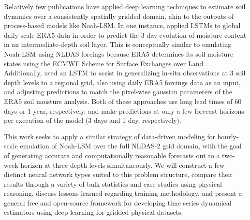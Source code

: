 Relatively few publications have applied deep learning techniques to estimate soil dynamics over a consistently spatially gridded domain, akin to the outputs of process-based models like Noah-LSM.  In one instance, \parencite{filipovic_regional_2022} applied LSTMs to global daily-scale ERA5 data in order to predict the 3-day evolution of moisture content in an intermediate-depth soil layer. This is conceptually similar to emulating Noah-LSM using NLDAS forcings because ERA5 determines its soil moisture states using the ECMWF Scheme for Surface Exchanges over Land \parencite{balsamo_revised_2009}. Additionally, \parencite{o_global_2021} used an LSTM to assist in generalizing in-situ observations at 3 soil depth levels to a regional grid, also using daily ERA5 forcings data as an input, and adjusting predictions to match the pixel-wise gaussian parameters of the ERA5 soil moisture analysis. Both of these approaches use long lead times of 60 days or 1 year, respectively, and make predictions at only a few forecast horizons per execution of the model (3 days and 1 day, respectively).

This work seeks to apply a similar strategy of data-driven modeling for hourly-scale emulation of Noah-LSM over the full NLDAS-2 grid domain, with the goal of generating accurate and computationally reasonable forecasts out to a two-week horizon at three depth levels simultaneously. We will construct a few distinct neural network types suited to this problem structure, compare their results through a variety of bulk statistics and case studies using physical reasoning, discuss lessons learned regarding training methodology, and present a general free and open-source framework for developing time series dynamical estimators using deep learning for gridded physical datasets.
